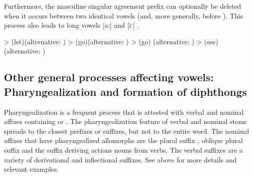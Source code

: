 Furthermore, the masculine singular agreement prefix  can optionally be deleted when it occurs between two identical vowels (and, more generally, before ). This process also leads to long vowels [aː] and [iː] .
%
\begin{exe}
	\ex	\label{ex:identical vowels B phon}
	\begin{xlist}
		\ex	{} >   (let)\newline\hspace*{1em}(alternative: )
		\ex	{} >   (go)\newline\hspace*{1em}(alternative: )
		\ex	{} >   \newline\hspace*{1em}(go) (alternative: )
		\ex	{} >   (see)\newline\hspace*{1em}(alternative: )
	\end{xlist}
\end{exe}



\subsection{Other general processes affecting vowels: Pharyngealization and formation of diphthongs}
\label{ssec:Other general processes affecting vowels}

Pharyngealization is a frequent process that is attested with verbal and nominal affixes containing  or . The pharyngealization feature of verbal and nominal stems spreads to the closest prefixes or suffixes, but not to the entire word. The nominal affixes that have pharyngealized allomorphs are the plural suffix , oblique plural suffix  and the suffix  deriving actions nouns from verbs. The verbal suffixes are a variety of derivational and inflectional suffixes. See  above for more details and relevant examples.

